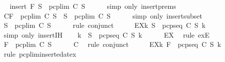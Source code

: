 \begin{isabellebody}
\ \isamarkupfalse%
\ {\isachardoublequoteopen}insert\ F\ S{\isacharprime}\ {\isasymsubseteq}\ pcp{\isacharunderscore}lim\ C\ S{\isachardoublequoteclose}\isanewline
\ \ \ \ \isamarkupfalse%
\ {\isacharparenleft}simp\ only{\isacharcolon}\ insert{\isachardot}prems{\isacharparenright}\isanewline
\ \ \isamarkupfalse%
\ \isamarkupfalse%
\ C{\isacharcolon}{\isachardoublequoteopen}F\ {\isasymin}\ {\isacharparenleft}pcp{\isacharunderscore}lim\ C\ S{\isacharparenright}\ {\isasymand}\ S{\isacharprime}\ {\isasymsubseteq}\ pcp{\isacharunderscore}lim\ C\ S{\isachardoublequoteclose}\isanewline
\ \ \ \ \isamarkupfalse%
\ {\isacharparenleft}simp\ only{\isacharcolon}\ insert{\isacharunderscore}subset{\isacharparenright}\ \isanewline
\ \ \isamarkupfalse%
\ \isamarkupfalse%
\ {\isachardoublequoteopen}S{\isacharprime}\ {\isasymsubseteq}\ pcp{\isacharunderscore}lim\ C\ S{\isachardoublequoteclose}\isanewline
\ \ \ \ \isamarkupfalse%
\ {\isacharparenleft}rule\ conjunct{}{\isacharparenright}\isanewline
\ \ \isamarkupfalse%
\ \isamarkupfalse%
\ EX{}{\isacharcolon}{\isachardoublequoteopen}{\isasymexists}k{\isachardot}\ S{\isacharprime}\ {\isasymsubseteq}\ pcp{\isacharunderscore}seq\ C\ S\ k{\isachardoublequoteclose}\isanewline
\ \ \ \ \isamarkupfalse%
\ {\isacharparenleft}simp\ only{\isacharcolon}\ insert{\isachardot}IH{\isacharparenright}\isanewline
\ \ \isamarkupfalse%
\ k{}\ \ {\isachardoublequoteopen}S{\isacharprime}\ {\isasymsubseteq}\ pcp{\isacharunderscore}seq\ C\ S\ k{}{\isachardoublequoteclose}\isanewline
\ \ \ \ \isamarkupfalse%
\ EX{}\ \isamarkupfalse%
\ {\isacharparenleft}rule\ exE{\isacharparenright}\isanewline
\ \ \isamarkupfalse%
\ {\isachardoublequoteopen}F\ {\isasymin}\ pcp{\isacharunderscore}lim\ C\ S{\isachardoublequoteclose}\isanewline
\ \ \ \ \isamarkupfalse%
\ C\ \isamarkupfalse%
\ {\isacharparenleft}rule\ conjunct{}{\isacharparenright}\isanewline
\ \ \isamarkupfalse%
\ \isamarkupfalse%
\ EX{}{\isacharcolon}{\isachardoublequoteopen}{\isasymexists}k{\isachardot}\ F\ {\isasymin}\ pcp{\isacharunderscore}seq\ C\ S\ k{\isachardoublequoteclose}\isanewline
\ \ \ \ \isamarkupfalse%
\ {\isacharparenleft}rule\ pcp{\isacharunderscore}lim{\isacharunderscore}inserted{\isacharunderscore}at{\isacharunderscore}ex{\isacharparenright}\isanewline

\end{isabellebody}
